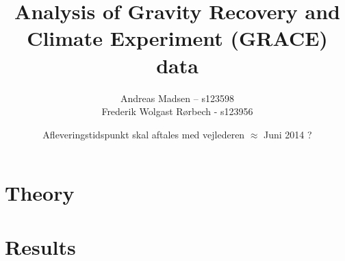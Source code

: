 \documentclass[a4paper]{article}
\numberwithin{equation}{section}
\numberwithin{figure}{section}
\numberwithin{table}{section}
\begin{document}
\title{Analysis of Gravity Recovery and Climate Experiment (GRACE) data}
\author{Andreas Madsen – s123598\\Frederik Wolgast Rørbech - s123956}
\date{Afleveringstidspunkt skal aftales med vejlederen $\approx$ Juni 2014 ?}
\maketitle

\setcounter{tocdepth}{2}
\pagebreak
\tableofcontents
\pagebreak





\pagebreak
\section{Theory}












\pagebreak
\section{Results}








\pagebreak


\pagebreak
\printbibliography
\end{document}
